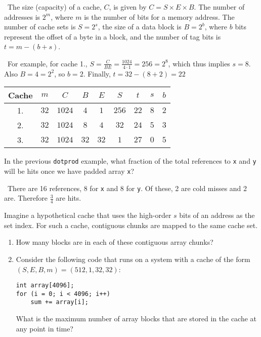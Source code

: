\documentclass[12pt]{article}
\newenvironment{ex}[2][Exercise]{\begin{trivlist}
		\item[\hskip \labelsep {\bfseries #1}\hskip \labelsep {\bfseries #2.}]}{\end{trivlist}}
\newenvironment{sol}[1][Solution]{\begin{trivlist}
		\item[\hskip \labelsep {\bfseries #1:}]}{\end{trivlist}}
\begin{document}
\begin{sol}
	\
	The size (capacity) of a cache, $C$, is given by $C=S\times E\times B$. The number of
	addresses is $2^{m}$, where $m$ is the number of bits for a memory address. The number of cache
	sets is $S=2^s$, the size of a data block is $B=2^b$, where $b$ bits represent the offset
	of a byte in a block, and the number of tag bits is $t=m-(b+s)$.
	
	\
	For example, for cache 1., $S=\frac{C}{BE}=\frac{1024}{4\cdot 1}=256=2^8$, which thus
	implies $s=8$. Also $B=4=2^2$, so $b=2$. Finally, $t=32 - (8 + 2) = 22$
	
	\begin{center}
		\begin{tabular}{ccccccccc}
			Cache & $m$ & $C$ & $B$ & $E$ & $S$ & $t$ & $s$ & $b$\\
			\hline
			1. & $32$ & $1024$ & $4$ & $1$&  $256$ & $22$ & $8$ & $2$ \\
			
			2. & $32$ & $1024$ & $8$ & $4$&  $32$ & $24$ & $5$ & $3$\\
			
			3. & $32$ & $1024$ & $32$ & $32$&  $1$ & $27$ & $0$ & $5$\\
		\end{tabular}
	\end{center}
\end{sol}

\begin{ex}{6.10}
	In the previous \texttt{dotprod} example, what fraction of the total references to \texttt{x}
	and \texttt{y} will be hits once we have padded array \texttt{x}?
\end{ex}

\begin{sol}
	\
	There are 16 references, 8 for \texttt{x} and 8 for \texttt{y}. Of these, 2 are cold misses
	and 2 are. Therefore $\frac{3}{4}$ are hits.
\end{sol}

\begin{ex}{6.11}
	Imagine a hypothetical cache that uses the high-order $s$ bits of an address as the set
	index. For such a cache, contiguous chunks are mapped to the same cache set.
	\begin{enumerate}[label=(\alph*)]
		\item How many blocks are in each of these contiguous array chunks?
		\item Consider the following code that runs on a system with a cache of the form
		$(S,E,B,m)=(512,1,32,32)$:
		\begin{lstlisting}
int array[4096];
for (i = 0; i < 4096; i++)
	sum += array[i];
		\end{lstlisting}
		What is the maximum number of array blocks that are stored in the cache at any point
		in time?
	\end{enumerate}
\end{ex}
\end{document}
